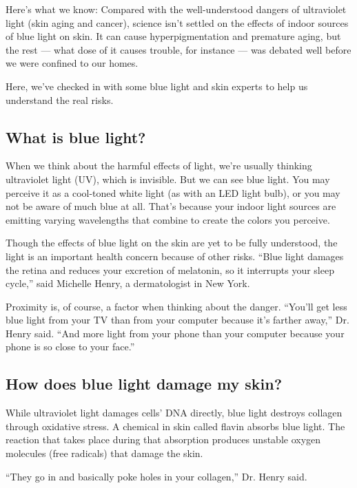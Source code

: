 Here's what we know: Compared with the well-understood dangers of
ultraviolet light (skin aging and cancer), science isn't settled on the
effects of indoor sources of blue light on skin. It can cause
hyperpigmentation and premature aging, but the rest --- what dose of it
causes trouble, for instance --- was debated well before we were
confined to our homes.

Here, we've checked in with some blue light and skin experts to help us
understand the real risks.

\hypertarget{what-is-blue-light}{%
\subsection{What is blue light?}\label{what-is-blue-light}}

When we think about the harmful effects of light, we're usually thinking
ultraviolet light (UV), which is invisible. But we can see blue light.
You may perceive it as a cool-toned white light (as with an LED light
bulb), or you may not be aware of much blue at all. That's because your
indoor light sources are emitting varying wavelengths that combine to
create the colors you perceive.

Though the effects of blue light on the skin are yet to be fully
understood, the light is an important health concern because of other
risks. ``Blue light damages the retina and reduces your excretion of
melatonin, so it interrupts your sleep cycle,'' said Michelle Henry, a
dermatologist in New York.

Proximity is, of course, a factor when thinking about the danger.
``You'll get less blue light from your TV than from your computer
because it's farther away,'' Dr. Henry said. ``And more light from your
phone than your computer because your phone is so close to your face.''

\hypertarget{how-does-blue-light-damage-my-skin}{%
\subsection{How does blue light damage my
skin?}\label{how-does-blue-light-damage-my-skin}}

While ultraviolet light damages cells' DNA directly, blue light destroys
collagen through oxidative stress. A chemical in skin called flavin
absorbs blue light. The reaction that takes place during that absorption
produces unstable oxygen molecules (free radicals) that damage the skin.

``They go in and basically poke holes in your collagen,'' Dr. Henry
said.

